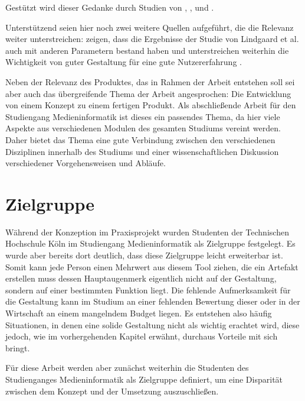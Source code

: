 Gestützt wird dieser Gedanke durch Studien von \cite{lindgaard2006attention}, \cite{campbell1996fitting}, und \cite{nickerson1998confirmation}.

Unterstützend seien hier noch zwei weitere Quellen aufgeführt, die die Relevanz weiter unterstreichen:
\cite{tractinsky2006evaluating} zeigen, dass die Ergebnisse der Studie von Lindgaard et al. auch mit anderen Parametern bestand haben und unterstreichen weiterhin die Wichtigkeit von guter Gestaltung für eine gute Nutzererfahrung \cite{tractinsky2000beautiful}.

Neben der Relevanz des Produktes, das in Rahmen der Arbeit entstehen soll sei aber auch das übergreifende Thema der Arbeit angesprochen: Die Entwicklung von einem Konzept zu einem fertigen Produkt.
Als abschließende Arbeit für den Studiengang Medieninformatik ist dieses ein passendes Thema, da hier viele Aspekte aus verschiedenen Modulen des gesamten Studiums vereint werden. Daher bietet das Thema eine gute Verbindung zwischen den verschiedenen Disziplinen innerhalb des Studiums und einer wissenschaftlichen Diskussion verschiedener Vorgehensweisen und Abläufe.


\section{Zielgruppe}
Während der Konzeption im Praxisprojekt wurden Studenten der Technischen Hochschule Köln im Studiengang Medieninformatik als Zielgruppe festgelegt. Es wurde aber bereits dort deutlich, dass diese Zielgruppe leicht erweiterbar ist. Somit kann jede Person einen Mehrwert aus diesem Tool ziehen, die ein Artefakt erstellen muss dessen Hauptaugenmerk eigentlich nicht auf der Gestaltung, sondern auf einer bestimmten Funktion liegt. Die fehlende Aufmerksamkeit für die Gestaltung kann im Studium an einer fehlenden Bewertung dieser oder in der Wirtschaft an einem mangelndem Budget liegen. Es entstehen also häufig Situationen, in denen eine solide Gestaltung nicht als wichtig erachtet wird, diese jedoch, wie im vorhergehenden Kapitel erwähnt, durchaus Vorteile mit sich bringt.

Für diese Arbeit werden aber zunächst weiterhin die Studenten des Studienganges Medieninformatik als Zielgruppe definiert, um eine Disparität zwischen dem Konzept und der Umsetzung auszuschließen.

